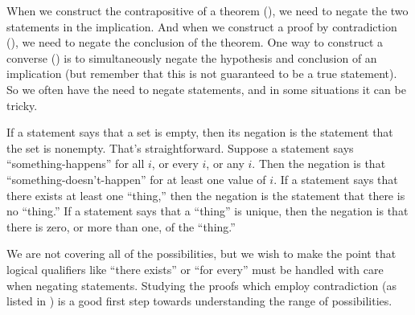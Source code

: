 When we construct the contrapositive of a theorem (), we need to negate the two statements in the implication.  And when we construct a proof by contradiction (), we need to negate the conclusion of the theorem.  One way to construct a converse () is to simultaneously negate the hypothesis and conclusion of an implication (but remember that this is not guaranteed to be a true statement).  So we often have the need to negate statements, and in some situations it can be tricky.\par
%
If a statement says that a set is empty, then its negation is the statement that the set is nonempty.  That's straightforward.  Suppose a statement says ``something-happens'' for all $i$, or every $i$, or any $i$.  Then the negation is that  ``something-doesn't-happen'' for at least one value of $i$.  If a statement says that there exists at least one ``thing,'' then the negation is the statement that there is no ``thing.''  If a statement says that a ``thing'' is unique, then the negation is that there is zero, or more than one, of the ``thing.''\par
%
We are not covering all of the possibilities, but we wish to make the point that logical qualifiers like ``there exists'' or ``for every'' must be handled with care when negating statements.  Studying the proofs which employ contradiction (as listed in ) is a good first step towards understanding the range of possibilities.